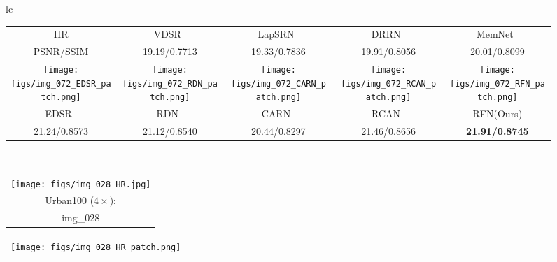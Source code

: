 \documentclass[preprint]{elsarticle}
\begin{document}
\begin{figure*}[htpb]
{\begin{tabular}{lc}
\begin{adjustbox}{valign=t}
\begin{tabular}{ccccc}
				HR & VDSR~\cite{VDSR} & LapSRN~\cite{LapSRN} & DRRN~\cite{DRRN} & MemNet~\cite{MemNet} \\
				PSNR/SSIM & 19.19/0.7713 & 19.33/0.7836 & 19.91/0.8056 & 20.01/0.8099 \\
				\texttt{[image: figs/img\_072\_EDSR\_patch.png]} &
				\hspace{-3mm}
				\texttt{[image: figs/img\_072\_RDN\_patch.png]} &
				\hspace{-3mm}
				\texttt{[image: figs/img\_072\_CARN\_patch.png]} &
				\hspace{-3mm}
				\texttt{[image: figs/img\_072\_RCAN\_patch.png]} &
				\hspace{-3mm}
				\texttt{[image: figs/img\_072\_RFN\_patch.png]} \\
				EDSR~\cite{EDSR} &\hspace{-3mm} RDN~\cite{RDN} &\hspace{-3mm} CARN~\cite{CARN} &\hspace{-3mm} RCAN~\cite{RCAN} &\hspace{-3mm} RFN(Ours) \\
				21.24/0.8573 &\hspace{-3mm} 21.12/0.8540 &\hspace{-3mm} 20.44/0.8297 &\hspace{-3mm} 21.46/0.8656 &\hspace{-3mm} \textbf{21.91/0.8745} \\
			\end{tabular}	
		\end{adjustbox}
		\\
		\begin{adjustbox}{valign=t}
			\scriptsize
			\begin{tabular}{c}
				\texttt{[image: figs/img\_028\_HR.jpg]} \\
				Urban100 ($4 \times$): \\
				img\_028 \\
			\end{tabular}
		\end{adjustbox}
		\hspace{-4mm}
		\begin{adjustbox}{valign=t}
			\scriptsize
			\begin{tabular}{ccccc}
				\texttt{[image: figs/img\_028\_HR\_patch.png]} &

\end{tabular}
\end{adjustbox}
\end{tabular}}
\end{figure*}
\end{document}
